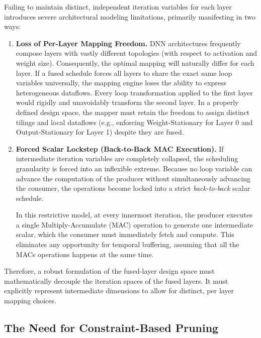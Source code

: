 Failing to maintain distinct, independent iteration variables for each layer introduces severe architectural modeling limitations, primarily manifesting in two ways:

\begin{enumerate}
  \item \textbf{Loss of Per-Layer Mapping Freedom.}
        DNN architectures frequently compose layers with vastly different topologies (with respect to activation and weight size). Consequently, the optimal mapping will naturally differ for each layer. 
        If a fused schedule forces all layers to share the exact same loop variables universally, the mapping engine loses the ability to express heterogeneous dataflows. Every loop transformation applied to the first layer would rigidly and unavoidably transform the second layer. In a properly defined design space, the mapper must retain the freedom to assign distinct tilings and local dataflows (e.g., enforcing Weight-Stationary for Layer 0 and Output-Stationary for Layer 1) despite they are fused.

  \item \textbf{Forced Scalar Lockstep (Back-to-Back MAC Execution).}
        If intermediate iteration variables are completely collapsed, the scheduling granularity is forced into an inflexible extreme. Because no loop variable can advance the computation of the producer without simultaneously advancing the consumer, the operations become locked into a strict \emph{back-to-back} scalar schedule. 
        
In this restrictive model, at every innermost iteration, the producer executes a single Multiply-Accumulate (MAC) operation to generate one intermediate scalar, which the consumer must immediately fetch and compute. This eliminates any opportunity for temporal buffering, assuming that all the MACs operations happens at the same time. 
\end{enumerate}

Therefore, a robust formulation of the fused-layer design space must mathematically decouple the iteration spaces of the fused layers. It must explicitly represent intermediate dimensions to allow for distinct, per layer mapping choices.

\subsection{The Need for Constraint-Based Pruning}
\label{sec:fds-pruning}

